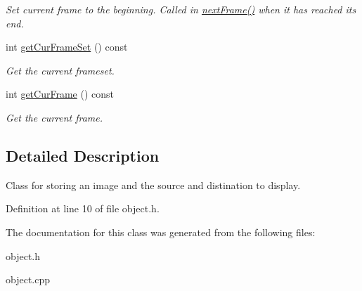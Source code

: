 \begin{DoxyCompactItemize}
\begin{DoxyCompactList}\small\item\em Set current frame to the beginning. Called in \hyperlink{classObject_a2c123e98f36c3779f5172afefacbf69c}{next\+Frame()} when it has reached its end. \end{DoxyCompactList}\item 
int \hyperlink{classObject_a3de9dd15d8ba28785284bccd2cfc406c}{get\+Cur\+Frame\+Set} () const \hypertarget{classObject_a3de9dd15d8ba28785284bccd2cfc406c}{}\label{classObject_a3de9dd15d8ba28785284bccd2cfc406c}

\begin{DoxyCompactList}\small\item\em Get the current frameset. \end{DoxyCompactList}\item 
int \hyperlink{classObject_a21b245ca66eaee32f3d942759c0de620}{get\+Cur\+Frame} () const \hypertarget{classObject_a21b245ca66eaee32f3d942759c0de620}{}\label{classObject_a21b245ca66eaee32f3d942759c0de620}

\begin{DoxyCompactList}\small\item\em Get the current frame. \end{DoxyCompactList}\end{DoxyCompactItemize}


\subsection{Detailed Description}
Class for storing an image and the source and distination to display. 

Definition at line 10 of file object.\+h.



The documentation for this class was generated from the following files\+:\begin{DoxyCompactItemize}
\item 
object.\+h\item 
object.\+cpp\end{DoxyCompactItemize}
